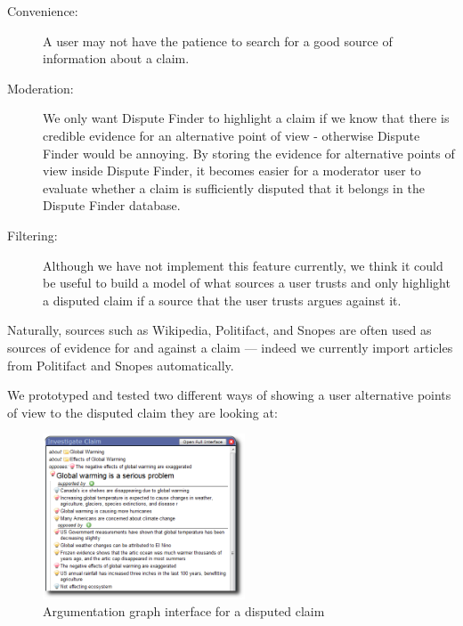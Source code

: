 \documentclass{www2010-submission}
\begin{document}
\begin{description}
\item[Convenience:] A user may not have the patience to search for a good source of information about a claim. 
\item[Moderation:] We only want Dispute Finder to highlight a claim if we know that there is credible evidence for an alternative point of view - otherwise Dispute Finder would be annoying. By storing the evidence for alternative points of view inside Dispute Finder, it becomes easier for a moderator user to evaluate whether a claim is sufficiently disputed that it belongs in the Dispute Finder database.
\item[Filtering:] Although we have not implement this feature currently, we think it could be useful to build a model of what sources a user trusts and only highlight a disputed claim if a source that the user trusts argues against it.
\end{description}

Naturally, sources such as Wikipedia, Politifact, and Snopes are often used as sources of evidence for and against a claim --- indeed we currently import articles from Politifact and Snopes automatically.

We prototyped and tested two different ways of showing a user alternative points of view to the disputed claim they are looking at:

\begin{figure}[tb]
	\begin{center}
	\includegraphics[width=6cm]{pictures/popup_graph_crop.png}
	\caption{Argumentation graph interface for a disputed claim}
	\label{popup_graph}
	\end{center}
\end{figure}
\end{document}

